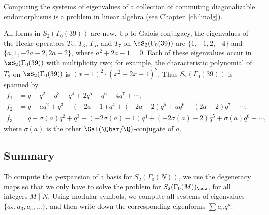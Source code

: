 Computing the systems of eigenvalues of a collection of
commuting diagonalizable endomorphisms is a problem in 
linear algebra (see Chapter~\ref{ch:linalg}).

\begin{example}
All forms in $S_2(\Gamma_0(39))$ are new. 
Up to Galois conjugacy, the eigenvalues of the Hecke operators
$T_2$, $T_3$, $T_5$, and $T_7$ on $\sS_2(\Gamma_0(39))$ are
$\{1, -1, 2, -4 \}$ and $\{a, 1, -2a-2, 2a+2\}$, where
$a^2+2a-1=0$.  Each of these eigenvalues occur
in $\sS_2(\Gamma_0(39))$ with multiplicity two; for example,
the characteristic polynomial of $T_2$ on $\sS_2(\Gamma_0(39))$ is
$(x - 1)^2\cdot(x^2+2x-1)^2$.
Thus $S_2(\Gamma_0(39))$ is spanned by 
\begin{align*}
f_1&=q + q^2 - q^3 - q^4 + 2q^5 - q^6 - 4q^7 + \cdots, \\
f_2&= q + aq^2 + q^3 + (-2a - 1)q^4 + (-2a - 2)q^5 + aq^6 + (2a + 2)q^7 
  + \cdots, \\
f_3&= q + \sigma(a)q^2 + q^3 + (-2\sigma(a) - 1)q^4 + (-2\sigma(a) - 2)q^5 + \sigma(a)q^6 
  + \cdots, 
\end{align*}
where $\sigma(a)$ is the other $\Gal(\Qbar/\Q)$-conjugate of $a$.
\end{example}

\subsection{Summary} 
To compute the $q$-expansion of a basis for $S_2(\Gamma_0(N))$, we use
the degeneracy maps so that we only have to solve the problem for
$S_2(\Gamma_0(M))_{\new}$, for all integers $M\mid N$.  Using modular
symbols, we compute all systems of eigenvalues $\{a_2, a_3,
a_5,\ldots\}$, and then write down the corresponding 
eigenforms $\sum a_n q^n$.

